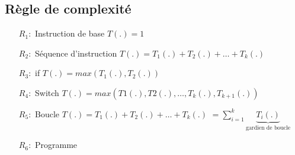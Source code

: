 \documentclass[a4paper, 11pt, oneside]{article}
\begin{document}
\subsection{Règle de complexité}
\begin{itemize}
	\item[$R_1 :$] Instruction de base \newline
					$T(.) = 1$ \newline
	\item[$R_2 :$] Séquence d'instruction \newline
					$T(.) = T_1(.) + T_2(.) + \ldots + T_k(.)$ \newline
	\item[$R_3 :$] if \newline
					$T(.) = max(T_1(.), T_2(.))$ \newline
	\item[$R_4 :$] Switch \newline
					$T(.) = max(T1(.), T2(.), \ldots, T_k(.), T_{k+1}(.))$\newline
	\item[$R_5 :$] Boucle \newline
					$T(.) = T_1(.) + T_2(.) + \ldots + T_k(.)$ \newline 
					$ = \sum_{i=1}^{k} \underbrace{T_i(.)}_{\text{gardien de boucle}}$ \newline
	\item[$R_6 :$] Programme \newline

\end{itemize}

\newpage
\end{document}
